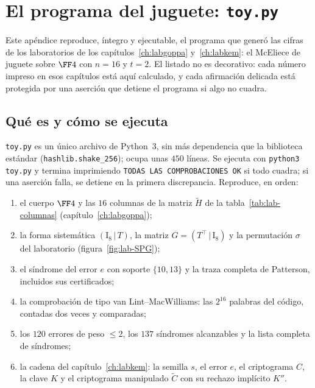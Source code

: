 
\appendix
\chapter{El programa del juguete: \texttt{toy.py}}\label{app:codigo}

\begin{roadmap}
Este apéndice reproduce, íntegro y ejecutable, el programa que generó
las cifras de los laboratorios de los
capítulos~\ref{ch:labgoppa} y~\ref{ch:labkem}: el McEliece de juguete
sobre $\FF4$ con $n=16$ y $t=2$. El listado no es decorativo: cada
número impreso en esos capítulos está aquí calculado, y cada
afirmación delicada está protegida por una aserción que detiene el
programa si algo no cuadra.
\end{roadmap}

\section{Qué es y cómo se ejecuta}

\texttt{toy.py} es un único archivo de Python~3, sin más dependencia
que la biblioteca estándar (\texttt{hashlib.shake\_256}); ocupa unas
$450$ líneas. Se ejecuta con \texttt{python3 toy.py} y termina
imprimiendo \texttt{TODAS LAS COMPROBACIONES OK} si todo cuadra; si
una aserción falla, se detiene en la primera discrepancia. Reproduce,
en orden:

\begin{enumerate}[leftmargin=1.8em,itemsep=2pt]
  \item el cuerpo $\FF4$ y las $16$ columnas de la matriz $\tilde H$
        de la tabla~\ref{tab:lab-columnas} (capítulo~\ref{ch:labgoppa});
  \item la forma sistemática $(\mathrm{I}_8\,|\,T)$, la matriz
        $G=(T^{\top}\,|\,\mathrm{I}_8)$ y la permutación
        $\sigma$ del laboratorio (figura~\ref{fig:lab-SPG});
  \item el síndrome del error $e$ con soporte $\{10,13\}$ y la
        traza completa de Patterson, incluidos sus certificados;
  \item la comprobación de tipo van Lint--MacWilliams: las $2^{16}$
        palabras del código, contadas dos veces y comparadas;
  \item los $120$ errores de peso $\le 2$, los $137$ síndromes
        alcanzables y la lista completa de síndromes;
  \item la cadena del capítulo~\ref{ch:labkem}: la semilla $s$, el
        error $e$, el criptograma $C$, la clave $K$ y el criptograma
        manipulado $\tilde C$ con su rechazo implícito $K''$.
\end{enumerate}

